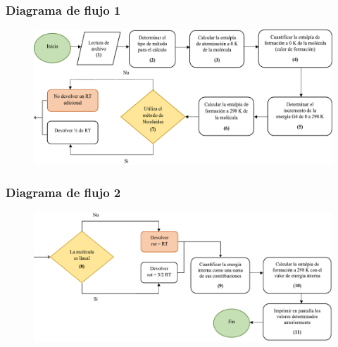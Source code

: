 \documentclass{beamer}
\begin{document}
\begin{frame}
\frametitle{Diagrama de flujo 1}
\begin{center}
\begin{figure}[h!]
\includegraphics[scale=.47]{images/df1}
\end{figure}
\end{center}
\end{frame}
\begin{frame}
\frametitle{Diagrama de flujo 2}
\begin{center}
\begin{figure}[h!]
\includegraphics[scale=.57]{images/df2}
\end{figure}
\end{center}
\end{frame}
\end{document}
